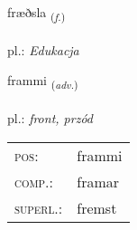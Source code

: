 \documentclass[frontgrid, backgrid]{flacards}\usepackage[]{graphicx}\usepackage[]{xcolor}
\begin{document}
\renewcommand{\blhead}{\vskip5pt {\small\bfseries\footnotesize Nafnorð | Noun }}
\renewcommand{\bcfoot}{\vskip5pt \hspace{2pt}{\small\bfseries\footnotesize 2K}}


{fræðsla \small{\textsubscript{(\textit{f.})}} \\[1ex] %
\textphonetic{[fraiðstla]} \\
pl.: \emph{Edukacja} \\  [2ex]
\renewcommand*{\arraystretch}{0.8}
}

\renewcommand{\flhead}{\vskip5pt \fboxsep=0pt {\small\bfseries\footnotesize Atviksorð | Adverb}}
\renewcommand{\fcfoot}{\vskip5pt \fboxsep=0pt \hspace{2pt}{\small\bfseries\footnotesize 2K}}

\renewcommand{\blhead}{\vskip5pt {\small\bfseries\footnotesize Atviksorð | Adverb }}
\renewcommand{\bcfoot}{\vskip5pt \hspace{2pt}{\small\bfseries\footnotesize 2K}}


{frammi \small{\textsubscript{(\textit{adv.})}} \\[1ex] %
\textphonetic{[framɪ]} \\
pl.: \emph{front, przód} \\  [2ex]
\renewcommand*{\arraystretch}{0.8}
\begin{tabular}{ll}
\textsc{pos}: & frammi \\ 
\textsc{comp.}: & framar \\ 
\textsc{superl.}: & fremst \\
\end{tabular}
}

\renewcommand{\flhead}{\vskip5pt \fboxsep=0pt {\small\bfseries\footnotesize Atviksorð | Adverb}}
\renewcommand{\fcfoot}{\vskip5pt \fboxsep=0pt \hspace{2pt}{\small\bfseries\footnotesize 2K}}
\end{document}
